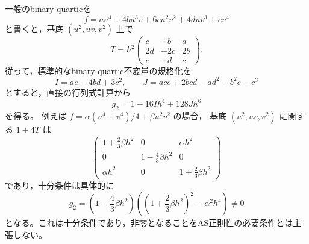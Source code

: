 一般のbinary quarticを
\[
 f=a u^4+4b u^3v+6c u^2v^2+4d uv^3+e v^4
\]
と書くと，基底 $(u^2,uv,v^2)$ 上で
\[
 T=h^2\begin{pmatrix}
 c&-b&a\\2d&-2c&2b\\e&-d&c
 \end{pmatrix}.
\]
従って，標準的なbinary quartic不変量の規格化を
\[
 I=ae-4bd+3c^2,\qquad
 J=ace+2bcd-ad^2-b^2e-c^3
\]
とすると，直接の行列式計算から
\begin{equation}\label{eq:simultaneous-binary-invariant-open}
 g_2=1-16Ih^4+128Jh^6
\end{equation}
を得る。
例えば $f=\alpha(u^4+v^4)/4+\beta u^2v^2$ の場合，
基底 $(u^2,uv,v^2)$ に関する $1+4T$ は
\[
 \begin{pmatrix}
 1+\frac23\beta h^2&0&\alpha h^2\\
 0&1-\frac43\beta h^2&0\\
 \alpha h^2&0&1+\frac23\beta h^2
 \end{pmatrix}
\]
であり，十分条件は具体的に
\begin{equation}\label{eq:simultaneous-even-quartic-determinant}
 g_2=\left(1-\frac43\beta h^2\right)
       \left(\left(1+\frac23\beta h^2\right)^2-\alpha^2h^4\right)\ne0
\end{equation}
となる。これは十分条件であり，非零となることをAS正則性の必要条件とは主張しない。

